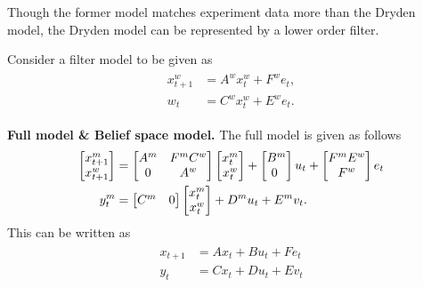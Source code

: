 \documentclass{ifacconf}
\begin{document}
 Though the former model matches experiment data more than the 
 Dryden model, the Dryden model can be represented by  a lower order filter.
 
Consider a filter model to be given as
\begin{align}
	\begin{aligned}
	x_{t+1}^w &= A^w x_{t}^w+ F^w e_{t},\\
	w_{t}&=C^w x_{t}^w+E^w e_{t}.
	\end{aligned}
\end{align}

\textbf{Full model \& Belief space model.}
The full model is given as follows
\begin{align} 
	\begin{bmatrix}
	x^m_{t+1}	\\x^w_{t+1}
	\end{bmatrix}
 &= \begin{bmatrix}
 	A^m 	& F^mC^w\\
 	0 & A^w
 \end{bmatrix}
\begin{bmatrix}
	x^m_{t}	\\x^w_{t}
	\end{bmatrix}+\begin{bmatrix} B^m \\ 0~ \end{bmatrix} u_{t}+  \begin{bmatrix}
	F^m E^w \\
	F^w
	\end{bmatrix}e_{t}\notag\\
	y^m_{t}&=\begin{bmatrix} C^m& 0 \end{bmatrix}\begin{bmatrix}
	x^m_{t}	\\x^w_{t}
	\end{bmatrix}+D^m u_{t}+E^m v_{t}.
\end{align}
This can be written as 
 \begin{align}  \begin{aligned}
x_{t+1}&=A x_{t} + B u_t+ Fe_t\\
y_t&=Cx_t+Du_t+Ev_t\end{aligned} \end{align}
\end{document}
